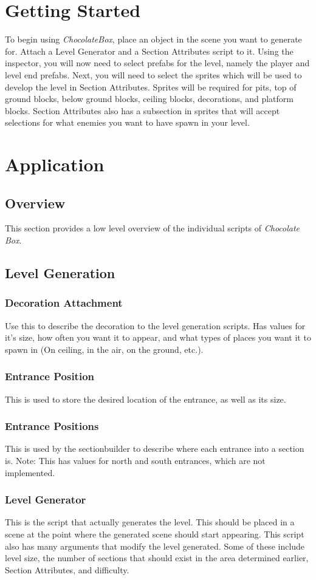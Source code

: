 \documentclass[pdftex,12pt,letter]{article}
\begin{document}
\section{Getting Started}
To begin using \textit{ChocolateBox}, place an object in the scene you want to generate for. Attach a Level Generator and a Section Attributes script to it.  Using the inspector, you will now need to select prefabs for the level, namely the player and level end prefabs. Next, you will need to select the sprites which will be used to develop the level in Section Attributes. Sprites will be required for pits, top of ground blocks, below ground blocks, ceiling blocks, decorations, and platform blocks. Section Attributes also has a subsection in sprites that will accept selections for what enemies you want to have spawn in your level. 

\section{Application}
\subsection{Overview}
This section provides a low level overview of the individual scripts of \textit{Chocolate Box}.
\subsection{Level Generation}
\subsubsection{Decoration Attachment}
Use this to describe the decoration to the level generation scripts. Has values for it's size, how often you want it to appear, and what types of places you want it to spawn in (On ceiling, in the air, on the ground, etc.).
\subsubsection{Entrance Position}
This is used to store the desired location of the entrance, as well as its size.
\subsubsection{Entrance Positions}
This is used by the sectionbuilder to describe where each entrance into a section is. Note: This has values for north and south entrances, which are not implemented.
\subsubsection{Level Generator}
This is the script that actually generates the level. This should be placed in a scene at the point where the generated scene should start appearing. This script also has many arguments that modify the level generated. Some of these include level size, the number of sections that should exist in the area determined earlier, Section Attributes, and difficulty. 
\end{document}
